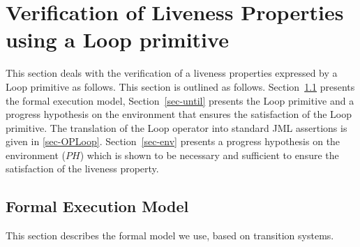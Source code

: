  \section{Verification of Liveness Properties using a \textsf{Loop} primitive}\label{sec-temporal}





This section deals with the verification of a liveness 
properties expressed by a \textsf{Loop} primitive as 
follows. This section is outlined as follows. 
Section~\ref{sec:prelim} presents the formal execution model,
Section~\ref{sec-until} presents the \textsf{Loop} primitive and a
progress hypothesis on the environment that ensures the 
satisfaction of the \textsf{Loop} primitive. The translation
of the \textsf{Loop} operator into standard \textsf{JML}
assertions is given in \ref{sec-OPLoop}. Section~\ref{sec-env} presents
a progress hypothesis on the environment ($PH$) which
is shown to be %
necessary and sufficient to
ensure the satisfaction of the liveness property.


\subsection{Formal Execution Model}
\label{sec:prelim}

This section  describes the formal model we use, 
based on transition systems.

